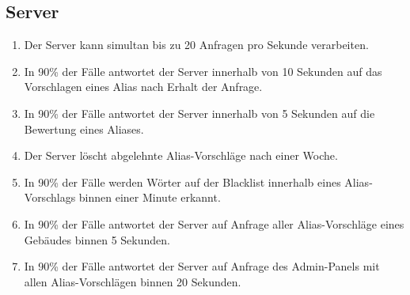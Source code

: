 \subsection{Server}

\begin{enumerate}
    \item Der Server kann simultan bis zu 20 Anfragen pro Sekunde verarbeiten.
    \item In 90\% der Fälle antwortet der Server innerhalb von 10 Sekunden auf das Vorschlagen eines Alias nach Erhalt der Anfrage.
    \item In 90\% der Fälle antwortet der Server innerhalb von 5 Sekunden auf die Bewertung eines Aliases.
    \item Der Server löscht abgelehnte Alias-Vorschläge nach einer Woche.
    \item In 90\% der Fälle werden Wörter auf der Blacklist innerhalb eines Alias-Vorschlags binnen einer Minute erkannt.
    \item In 90\% der Fälle antwortet der Server auf Anfrage aller Alias-Vorschläge eines Gebäudes binnen 5 Sekunden.
    \item In 90\% der Fälle antwortet der Server auf Anfrage des Admin-Panels mit allen Alias-Vorschlägen binnen 20 Sekunden.
\end{enumerate}